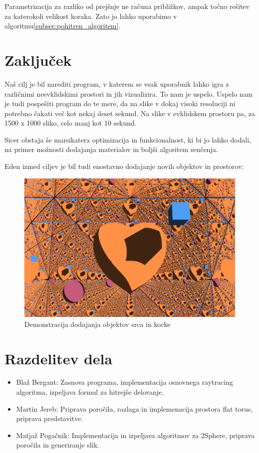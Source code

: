 \documentclass[titlepage]{article}
\begin{document}
Parametrizacija za razliko od prejšnje ne računa približkov, ampak točno rešitev za katerokoli velikost koraka. 
Zato jo lahko uporabimo v algoritmu\ref{subsec:pohitren_algoritem}.

\section{Zaključek}
Naš cilj je bil narediti program, v katerem se vsak uporabnik lahko igra z različnimi neevklidskimi
prostori in jih vizualizira. To nam je uspelo. Uspelo nam je tudi pospešiti program do te mere, da 
na slike v dokaj visoki resoluciji ni potrebno čakati več kot nekaj deset sekund. Na slike v evklidskem 
prostoru pa, za 1500 x 1000 sliko, celo manj kot 10 sekund.

Sicer obstaja še marsikatera optimizacija in funkcionalnost, ki bi jo lahko dodali,
na primer možnosti dodajanja materialov in boljši algoritem senčenja.

Eden izmed ciljev je bil tudi enostavno dodajanje novih objektov in prostorov:

\begin{figure} [H]
  \centering
  \includegraphics[width=0.9\linewidth]{Images/Flat_torus_24mm_heart_cube.png}
  \caption{Demonstracija dodajanja objektov srca in kocke}
  \label{fig:Flat_torus_heart}
\end{figure}



\section{Razdelitev dela}
\begin{itemize}
  \item Blaž Bergant: Zasnova programa, implementacija osnovnega raytracing algoritma, izpeljava formul za hitrejše delovanje.
  \item Martin Jereb: Priprava poročila, razlaga in implemenacija prostora flat torus, priprava predstavitve.
\item Matjaž Pogačnik: Implementacija in izpeljava algoritmov za 2Sphere, priprava poročila in generiranje slik.
\end{itemize}
\end{document}
